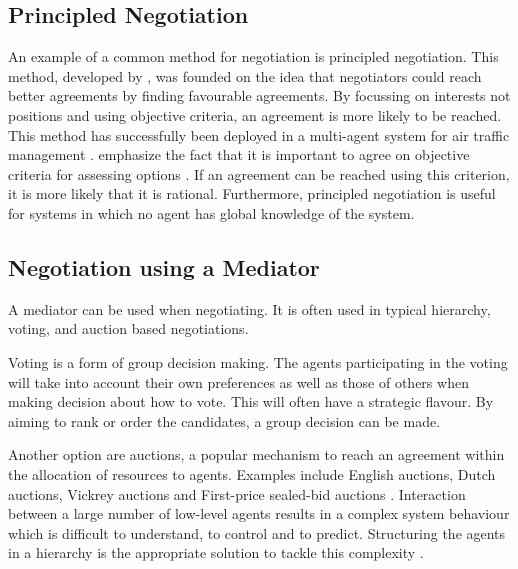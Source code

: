 \subsection{Principled Negotiation}
\label{sec:principlednegotiation}
An example of a common method for negotiation is principled negotiation. This method, developed by \citet{fisher1987getting}, was founded on the idea that negotiators could reach better agreements by finding favourable agreements. By focussing on interests not positions and using objective criteria, an agreement is more likely to be reached. This method has successfully been deployed in a multi-agent system for air traffic management \citep{wangermann1998principled}. \citet{fisher1987getting} emphasize the fact that it is important to agree on objective criteria for assessing options \citep{fisher1987getting}. If an agreement can be reached using this criterion, it is more likely that it is rational. Furthermore, principled negotiation is useful for systems in which no agent has global knowledge of the system.





\subsection{Negotiation using a Mediator}
A mediator can be used when negotiating. It is often used in typical hierarchy, voting, and auction based negotiations. 

Voting is a form of group decision making. The agents participating in the voting will take into account their own preferences as well as those of others when making decision about how to vote. This will often have a strategic flavour. By aiming to rank or order the candidates, a group decision can be made.

Another option are auctions, a popular mechanism to reach an agreement within the allocation of resources to agents. Examples include English auctions, Dutch auctions, Vickrey auctions and First-price sealed-bid auctions \citep{wooldridge2009introduction}. Interaction between a large number of low-level agents results in a complex system behaviour which is difficult to understand, to control and to predict. Structuring the agents in a hierarchy is the appropriate solution to tackle this complexity \citep{van1998reference}.

